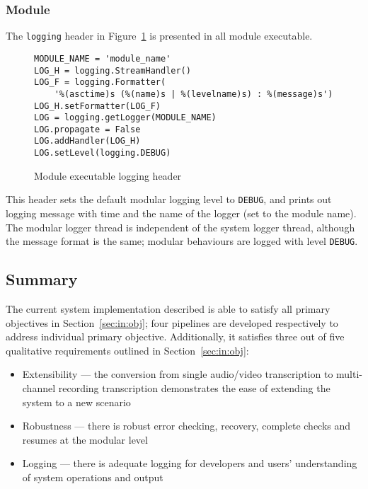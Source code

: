 \subsubsection{Module}

The \texttt{logging} header in Figure~\ref{log-mod} is presented in all
module executable.

\begin{figure}[ht]
\begin{lstlisting}
MODULE_NAME = 'module_name'
LOG_H = logging.StreamHandler()
LOG_F = logging.Formatter(
    '%(asctime)s (%(name)s | %(levelname)s) : %(message)s')
LOG_H.setFormatter(LOG_F)
LOG = logging.getLogger(MODULE_NAME)
LOG.propagate = False
LOG.addHandler(LOG_H)
LOG.setLevel(logging.DEBUG)
\end{lstlisting}
\caption{Module executable logging header}\label{log-mod}
\end{figure}

This header sets the default modular logging level to \texttt{DEBUG}, and prints
out logging message with time and the name of the logger (set to the module name).
The modular logger thread is independent of the system logger thread, although
the message format is the same; modular behaviours are logged with level
\texttt{DEBUG}.

\subsection{Summary}\label{sec:im:code:summ}

The current system implementation described is able to satisfy all primary
objectives in Section~\ref{sec:in:obj}; four pipelines are developed respectively
to address individual primary objective. Additionally, it satisfies three out of
five qualitative requirements outlined in Section~\ref{sec:in:obj}:

\begin{itemize}
    \item Extensibility --- the conversion from single audio/video transcription
    to multi-channel recording transcription demonstrates the ease of extending
    the system to a new scenario
    \item Robustness --- there is robust error checking, recovery, complete checks
    and resumes at the modular level
    \item Logging --- there is adequate logging for developers and users'
    understanding of system operations and output
\end{itemize}


